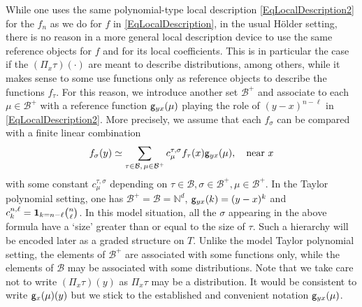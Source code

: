 \documentclass[10pt, reqno]{amsart}
\numberwithin{subsection}{section}
\numberwithin{subsubsection}{subsection}
\numberwithin{equation}{section} %
\theoremstyle{mystyle}
\theoremstyle{mystyle2}
\theoremstyle{mystyle3}
\newcommand{\ssk}{\smallskip}
\newcommand\bbN{\mathbb{N}}
\newcommand{\mcB}{\mathcal{B}}
\begin{document}
While one uses the same polynomial-type local description \eqref{EqLocalDescription2} for the $f_n$ as we do for $f$ in \eqref{EqLocalDescription}, in the usual H\"older setting, there is no reason in a more general local description device to use the same reference objects for $f$ and for its local coefficients. This is in particular the case if the $(\Pi_x\tau)(\cdot)$ are meant to describe distributions, among others, while it makes sense to some use functions only as reference objects to describe the functions $f_\tau$. For this reason, we introduce another set $\mcB^+$ and associate to each $\mu\in\mcB^+$ with a reference function ${\sf g}_{yx}(\mu)$ playing the role of $(y-x)^{n-\ell}$ in \eqref{EqLocalDescription2}. More precisely, we assume that each $f_\sigma$ can be compared with a finite linear combination
\begin{equation} \label{EqTransitionfTau}
f_\sigma(y) \simeq \sum_{\tau\in\mcB,\, \mu\in\mcB^+} c_\mu^{\tau,\sigma}f_\tau(x) {\sf g}_{yx}(\mu), \quad\textrm{near }x
\end{equation}
with some constant $c_\mu^{\tau,\sigma}$ depending on $\tau\in\mcB,\sigma\in\mcB^+,\mu\in\mcB^+$. In the Taylor polynomial setting, one has $\mcB^+=\mcB=\bbN^d$, ${\sf g}_{yx}(k)=(y-x)^k$ and $c_k^{n,\ell}={\bf1}_{k=n-\ell}{n\choose\ell}$. In this model situation, all the $\sigma$ appearing in the above formula have a `size' greater than or equal to the size of $\tau$. Such a hierarchy will be encoded later as a graded structure on $T$. Unlike the model Taylor polynomial setting, the elements of $\mcB^+$ are associated with some functions only, while the elements of $\mcB$ may be associated with some distributions. Note that we take care not to write $(\Pi_x\tau)(y)$ as $\Pi_x\tau$ may be a distribution. It would be consistent to write ${\sf g}_x(\mu)(y)$ but we stick to the established and convenient notation ${\sf g}_{yx}(\mu)$. 

\ssk
\end{document}
